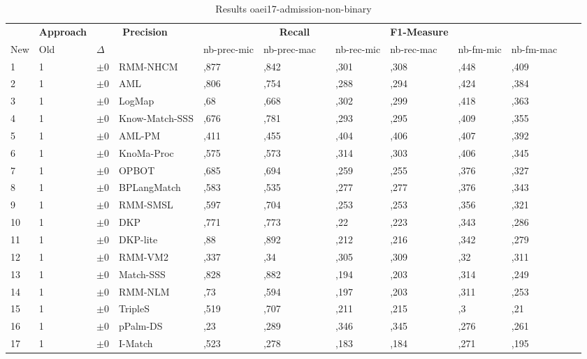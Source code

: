\begin{table}[htb]
\setlength{\tabcolsep}{0.5em}
\centering
\scriptsize
\begin{tabular}[tb]{lllp{2.3cm}llllllllll}
\noalign{\smallskip}\hline\noalign{\smallskip}
\multicolumn{3}{c}{\textbf{Rank}}& \textbf{Approach}  & \multicolumn{2}{c}{\textbf{Precision}}  & \hspace*{1mm}  & \multicolumn{2}{c}{\textbf{Recall}}  & \hspace*{1mm}  & \multicolumn{2}{c}{\textbf{F1-Measure}}  & \hspace*{1mm} \\
New & Old & $\Delta$ & &nb-prec-mic & nb-prec-mac && nb-rec-mic & nb-rec-mac && nb-fm-mic & nb-fm-mac\\
\noalign{\smallskip}\hline\noalign{\smallskip}
1 & 1 		& $\pm$0 &RMM-NHCM    	&	,877 & ,842 & & ,301 & ,308 & & ,448 & ,409\\
2 & 1 		& $\pm$0 &AML    	&	,806 & ,754 & & ,288 & ,294 & & ,424 & ,384\\
3 & 1 		& $\pm$0 &LogMap    	&	,68 & ,668 & & ,302 & ,299 & & ,418 & ,363\\
4 & 1 		& $\pm$0 &Know-Match-SSS    	&	,676 & ,781 & & ,293 & ,295 & & ,409 & ,355\\
5 & 1 		& $\pm$0 &AML-PM    	&	,411 & ,455 & & ,404 & ,406 & & ,407 & ,392\\
6 & 1 		& $\pm$0 &KnoMa-Proc    	&	,575 & ,573 & & ,314 & ,303 & & ,406 & ,345\\
7 & 1 		& $\pm$0 &OPBOT    	&	,685 & ,694 & & ,259 & ,255 & & ,376 & ,327\\
8 & 1 		& $\pm$0 &BPLangMatch    	&	,583 & ,535 & & ,277 & ,277 & & ,376 & ,343\\
9 & 1 		& $\pm$0 &RMM-SMSL    	&	,597 & ,704 & & ,253 & ,253 & & ,356 & ,321\\
10 & 1 		& $\pm$0 &DKP    	&	,771 & ,773 & & ,22 & ,223 & & ,343 & ,286\\
11 & 1 		& $\pm$0 &DKP-lite    	&	,88 & ,892 & & ,212 & ,216 & & ,342 & ,279\\
12 & 1 		& $\pm$0 &RMM-VM2    	&	,337 & ,34 & & ,305 & ,309 & & ,32 & ,311\\
13 & 1 		& $\pm$0 &Match-SSS    	&	,828 & ,882 & & ,194 & ,203 & & ,314 & ,249\\
14 & 1 		& $\pm$0 &RMM-NLM    	&	,73 & ,594 & & ,197 & ,203 & & ,311 & ,253\\
15 & 1 		& $\pm$0 &TripleS    	&	,519 & ,707 & & ,211 & ,215 & & ,3 & ,21\\
16 & 1 		& $\pm$0 &pPalm-DS    	&	,23 & ,289 & & ,346 & ,345 & & ,276 & ,261\\
17 & 1 		& $\pm$0 &I-Match    	&	,523 & ,278 & & ,183 & ,184 & & ,271 & ,195\\
\end{tabular}
\caption{Results oaei17-admission-non-binary}
\label{tbl:results}
\end{table}